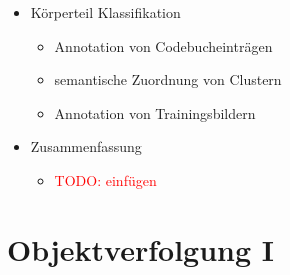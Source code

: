 \documentclass{report}
\newcommand{\todo}[2][red]{\textcolor{#1}{TODO: #2}}
\begin{document}
\begin{itemize}
		\item Körperteil Klassifikation
		\begin{itemize}
			\item Annotation von Codebucheinträgen
			\item semantische Zuordnung von Clustern\newline
			
			\item Annotation von Trainingsbildern
		\end{itemize}
		
		\item Zusammenfassung
		\begin{itemize}
			\item \todo{einfügen}
		\end{itemize}
		
	\end{itemize}
	\newpage
	
	\section{Objektverfolgung I}
	
\end{document}
